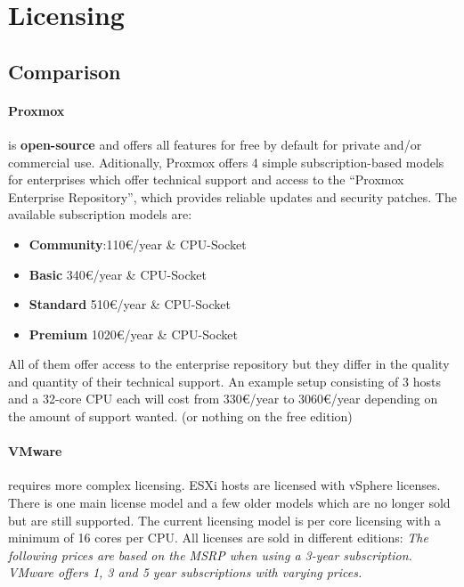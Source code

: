 
\section{Licensing}

\subsection{Comparison}

\paragraph{Proxmox} 
is \textbf{open-source} and offers all features for free by default for private and/or commercial use. Aditionally, Proxmox offers 4 simple subscription-based models for enterprises which offer technical support and access to the \enquote{Proxmox Enterprise Repository}, which provides reliable updates and security patches. The available subscription models are:
\begin{itemize}
	\item \textbf{Community}:\num{ 110}€/year \& CPU-Socket
	\item \textbf{Basic} \num{340}€/year \& CPU-Socket
	\item \textbf{Standard} \num{510}€/year \& CPU-Socket
	\item \textbf{Premium} \num{1020}€/year \& CPU-Socket
\end{itemize}
All of them offer access to the enterprise repository but they differ in the quality and quantity of their technical support.\newline
An example setup consisting of 3 hosts and a 32-core CPU each will cost from \num{330}€/year to \num{3060}€/year depending on the amount of support wanted. (or nothing on the free edition)


\paragraph{VMware} requires more complex licensing.\newline
ESXi hosts are licensed with vSphere licenses. There is one main license model and a few older models which are no longer sold but are still supported. The current licensing model is per core licensing with a minimum of 16 cores per CPU. All licenses are sold in different editions:\newline 
\textit{The following prices are based on the MSRP when using a 3-year subscription. VMware offers 1, 3 and 5 year subscriptions with varying prices.}

